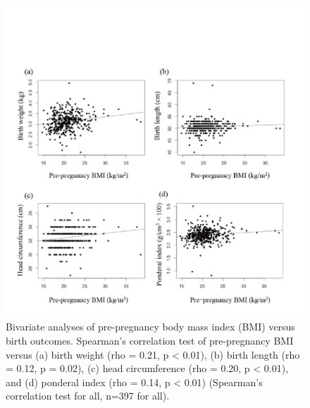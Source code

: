 \begin{figure}
  \centering
    \label{fig:Fig37}
  \includegraphics[scale=1]{Figures/Fig37.pdf}
  \caption[Bivariate analyses of pre-pregnancy body mass index versus birth outcomes]{Bivariate analyses of pre-pregnancy body mass index (BMI) versus birth outcomes. Spearman's correlation test of pre-pregnancy BMI versus (a) birth weight (rho = 0.21, p < 0.01), (b) birth length (rho = 0.12, p = 0.02), (c) head circumference (rho = 0.20, p < 0.01), and (d) ponderal index (rho = 0.14, p < 0.01) (Spearman's correlation test for all, n=397 for all).}
\end{figure}

